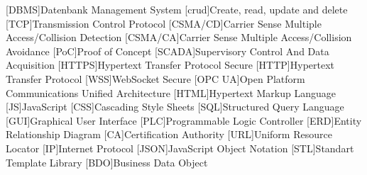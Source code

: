 \begin{multicols}{2}
  \begin{acronym}
  [DBMS]{Datenbank Management  System}
  [crud]{Create, read, update and delete}
  [TCP]{Transmission Control Protocol}
  [CSMA/CD]{Carrier Sense Multiple Access/Collision Detection}
  [CSMA/CA]{Carrier Sense Multiple Access/Collision Avoidance}
  [PoC]{Proof of Concept}
  [SCADA]{Supervisory Control And Data Acquisition}
  [HTTPS]{Hypertext Transfer Protocol Secure}
  [HTTP]{Hypertext Transfer Protocol}
  [WSS]{WebSocket Secure}
  [OPC UA]{Open Platform Communications Unified Architecture}
  [HTML]{Hypertext Markup Language}
  [JS]{JavaScript}
  [CSS]{Cascading Style Sheets}
  [SQL]{Structured Query Language}
  [GUI]{Graphical User Interface}
  [PLC]{Programmable Logic Controller}
  [ERD]{Entity Relationship Diagram}
  [CA]{Certification Authority}
  [URL]{Uniform Resource Locator}
  [IP]{Internet Protocol}
  [JSON]{JavaScript Object Notation}
  [STL]{Standart Template Library}
  [BDO]{Business Data Object}
\end{acronym}
\end{multicols}
